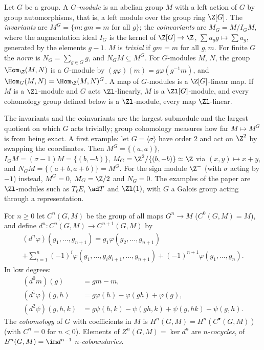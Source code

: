 \begin{definition}[$G$-modules]\label{def:cohomology:gmodule}
Let $G$ be a group. A \emph{$G$-module} is an abelian group $M$ with a left action of $G$ by group automorphisms, that is, a left module over the group
ring $\Z[G]$. The \emph{invariants} are $M^G=\{m:gm=m\text{ for all }g\}$; the \emph{coinvariants} are $M_G=M/I_GM$, where the augmentation ideal $I_G$ is
the kernel of $\Z[G]\to\Z$, $\sum a_gg\mapsto\sum a_g$, generated by the elements $g-1$. $M$ is \emph{trivial} if $gm=m$ for all $g,m$. For finite $G$ the
\emph{norm} is $N_G=\sum_{g\in G}g$, and $N_GM\subseteq M^G$. For $G$-modules $M$, $N$, the group $\Hom_\Z(M,N)$ is a $G$-module by
$(g\varphi)(m)=g\varphi(g^{-1}m)$, and $\Hom_G(M,N)=\Hom_\Z(M,N)^G$. A map of $G$-modules is a $\Z[G]$-linear map.
If $M$ is a $\Zl$-module and $G$ acts $\Zl$-linearly, $M$ is a $\Zl[G]$-module, and every cohomology group defined below is a $\Zl$-module, every map
$\Zl$-linear.
\end{definition}

The invariants and the coinvariants are the largest submodule and the largest quotient on which $G$ acts trivially; group cohomology measures how far
$M\mapsto M^G$ is from being exact. A first example: let $G=\langle\sigma\rangle$ have order $2$ and act on $\Z^2$ by swapping the coordinates. Then
$M^G=\{(a,a)\}$, $I_GM=(\sigma-1)M=\{(b,-b)\}$, $M_G=\Z^2/\{(b,-b)\}\simeq\Z$ via $(x,y)\mapsto x+y$, and $N_GM=\{(a+b,a+b)\}=M^G$. For the sign module $\Z^-$ (with
$\sigma$ acting by $-1$) instead, $M^G=0$, $M_G=\Z/2$ and $N_G=0$. The examples of the paper are $\Zl$-modules such as $T_\ell E$, $\ad T$ and $\Zl(1)$, with $G$ a
Galois group acting through a representation.

\begin{definition}\label{def:cohomology:cochains}
For $n\ge0$ let $C^n(G,M)$ be the group of all maps $G^n\to M$ ($C^0(G,M)=M$), and define $d^n\colon C^n(G,M)\to C^{n+1}(G,M)$ by
\begin{multline*}
(d^n\varphi)(g_1,\dots,g_{n+1})=g_1\varphi(g_2,\dots,g_{n+1})\\
+\sum_{i=1}^{n}(-1)^i\varphi(g_1,\dots,g_ig_{i+1},\dots,g_{n+1})+(-1)^{n+1}\varphi(g_1,\dots,g_n).
\end{multline*}
In low degrees:
\begin{align*}
(d^0m)(g)&=gm-m,\\
(d^1\varphi)(g,h)&=g\varphi(h)-\varphi(gh)+\varphi(g),\\
(d^2\psi)(g,h,k)&=g\psi(h,k)-\psi(gh,k)+\psi(g,hk)-\psi(g,h).
\end{align*}
The \emph{cohomology} of $G$ with coefficients in $M$ is $H^n(G,M)=H^n(C^\bullet(G,M))$ (with $C^n=0$ for $n<0$). Elements of $Z^n(G,M)=\ker d^n$ are
\emph{$n$-cocycles}, of $B^n(G,M)=\im d^{n-1}$ \emph{$n$-coboundaries}.
\end{definition}

